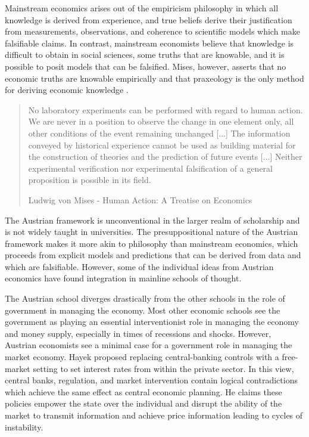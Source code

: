 
Mainstream economics arises out of the empiricism philosophy in which all
knowledge is derived from experience, and true beliefs derive their
justification from measurements, observations, and coherence to scientific
models which make falsifiable claims. In contrast, mainstream economists believe
that knowledge is difficult to obtain in social sciences, some truths that are
knowable, and it is possible to posit models that can be falsified. Mises,
however, asserts that no economic truths are knowable empirically and that
praxeology is the only method for deriving economic knowledge
\cite{golumbia_cyberlibertarianism_2013, golumbia_cyberlibertarians_2013}.

\begin{quote}
No laboratory experiments can be performed with regard to human action.
We are never in a position to observe the change in one element only,
all other conditions of the event remaining unchanged [...] The
information conveyed by historical experience cannot be used as building
material for the construction of theories and the prediction of future
events [...] Neither experimental verification nor experimental
falsification of a general proposition is possible in its field.
\begin{flushright}
Ludwig von Mises - Human Action: A Treatise on Economics
\end{flushright}
\end{quote}



The Austrian framework is unconventional in the larger realm of scholarship and
is not widely taught in universities. The presuppositional nature of the
Austrian framework makes it more akin to philosophy than mainstream economics,
which proceeds from explicit models and predictions that can be derived from
data and which are falsifiable. However, some of the individual ideas from
Austrian economics have found integration in mainline schools of thought.

The Austrian school diverges drastically from the other schools in the role of
government in managing the economy. Most other economic schools see the
government as playing an essential interventionist role in managing the economy
and money supply, especially in times of recessions and shocks. However,
Austrian economists see a minimal case for a government role in managing the
market economy. Hayek proposed replacing central-banking controls with a
free-market setting to set interest rates from within the private sector. In
this view, central banks, regulation, and market intervention contain logical
contradictions which achieve the same effect as central economic planning. He
claims these policies empower the state over the individual and disrupt the
ability of the market to transmit information and achieve price information
leading to cycles of instability.

